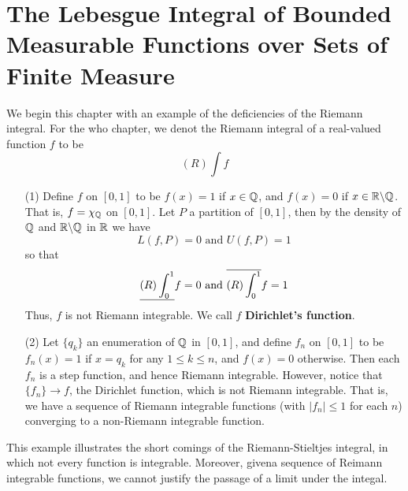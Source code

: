 \section{The Lebesgue Integral of Bounded Measurable Functions over Sets of
Finite Measure}

We begin this chapter with an example of the deficiencies of the Riemann
integral. For the who chapter, we denot the Riemann integral of a real-valued
function $f$ to be
\begin{equation*}
    (R)\int{f}
\end{equation*}

\begin{example}\label{example_10.1}
    \begin{enumerate}
        \item[(1)] Define $f$ on  $[0,1]$ to be $f(x)=1$ if $x \in \mathbb{Q}$, and
            $f(x)=0$ if $x \in \mathbb{R} \backslash \mathbb{Q}$. That is, $f=\chi_{\mathbb{Q}}$ on $[0,1]$.
            Let $P$ a partition of  $[0,1]$, then by the density of $\mathbb{Q}$ and
            $\mathbb{R} \backslash \mathbb{Q}$ in $\mathbb{R}$ we have
            \begin{equation*}
                L(f,P)=0 \text{ and } U(f,P)=1
            \end{equation*}
            so that
            \begin{equation*}
                \underline{(R)\int_0^1}{f}=0 \text{ and } \overline{(R)\int_0^1}{f}=1
            \end{equation*}
            Thus, $f$ is not Riemann integrable. We call  $f$
            \textbf{Dirichlet's function}.

        \item[(2)] Let $\{q_k\}$ an enumeration of $\mathbb{Q}$ in $[0,1]$, and define
            $f_n$ on  $[0,1]$ to be $f_n(x)=1$ if $x=q_k$ for any  $1 \leq k
            \leq n$, and  $f(x)=0$ otherwise. Then each $f_n$ is a step
            function, and hence Riemann integrable. However, notice that
            $\{f_n\} \xrightarrow{} f$, the Dirichlet function, which is not
            Riemann integrable. That is, we have a sequence of Riemann
            integrable functions (with $|f_n| \leq 1$ for each $n$) converging
            to a non-Riemann integrable function.
    \end{enumerate}
\end{example}

This example illustrates the short comings of the Riemann-Stieltjes integral, in
which not every function is integrable. Moreover, givena sequence of Reimann
integrable functions, we cannot justify the passage of a limit under the
integal.


